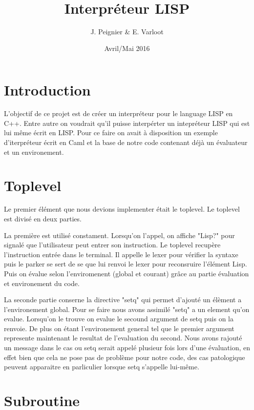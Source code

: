 \documentclass[a4paper]{article}
\title{Interpréteur LISP}
\author{J. Peignier \& E. Varloot}
\date{Avril/Mai 2016}
\begin{document}
\maketitle

\tableofcontents

\pagebreak
	
\section{Introduction}

	L'objectif de ce projet est de créer un interpréteur pour le language LISP en C++. Entre autre on voudrait qu'il puisse interpérter un intepréteur LISP qui est lui même écrit en LISP.
	Pour ce faire on avait à disposition un exemple d'iterpréteur écrit en Caml et la base de notre code contenant déjà un évaluateur et un environement.

\section{Toplevel}

	Le premier élément que nous devions implementer était le toplevel. Le toplevel est divisé en deux parties.
	
	 La première est utilisé constament. Lorsqu'on l'appel, on affiche "Lisp?" pour signalé que l'utilisateur peut entrer son instruction. Le toplevel recupère l'instruction entrée dans le terminal. Il appelle le lexer pour vérifier la syntaxe puis le parker se sert de se que lui renvoi le lexer pour reconsruire l'élément Lisp. Puis on évalue selon l'enviromenent (global et courant) grâce au partie évaluation et environement du code.
	 
	 La seconde partie conserne la directive "setq" qui permet d'ajouté un élèment a l'environement global. Pour se faire nous avons assimilé "setq" a un element qu'on evalue. Lorsqu'on le trouve on evalue le secound argument de setq puis on la renvoie. De plus on étant l'environement general tel que le premier argument represente maintenant le resultat de l'evaluation du second.
	Nous avons rajouté un message dans le cas ou setq serait appelé plusieur fois lors d'une évaluation, en effet bien que cela ne pose pas de problème pour notre code, des cas patologique peuvent apparaitre en parliculier lorsque setq s'appelle lui-même.

\section{Subroutine}
\end{document}
